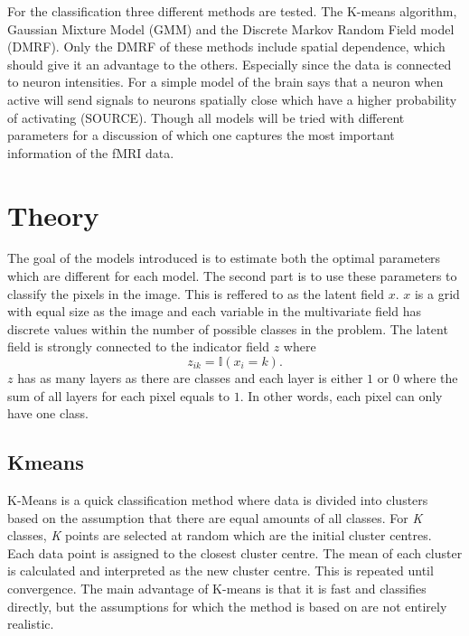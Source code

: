 \documentclass[a4paper,english]{article}
\begin{document}
For the classification three different methods are tested.
The K-means algorithm, Gaussian Mixture Model (GMM) and the Discrete Markov Random Field model (DMRF).
Only the DMRF of these methods include spatial dependence, which should give it an advantage to the others.
Especially since the data is connected to neuron intensities.
For a simple model of the brain says that a neuron when active will send signals to neurons spatially close which have a higher probability of activating (SOURCE).
Though all models will be tried with different parameters for a discussion of which one captures the most important information of the fMRI data.

\section{Theory}
The goal of the models introduced is to estimate both the optimal parameters which are different for each model.
The second part is to use these parameters to classify the pixels in the image.
This is reffered to as the latent field $x$.
$x$ is a grid with equal size as the image and each variable in the multivariate field has discrete values within the number of possible classes in the problem.
The latent field is strongly connected to the indicator field $z$ where
\begin{equation}
  z_{ik} = \mathds{I}(x_i = k).
\end{equation}
$z$ has as many layers as there are classes and each layer is either $1$ or $0$ where the sum of all layers for each pixel equals to $1$.
In other words, each pixel can only have one class.

\subsection{Kmeans}

K-Means is a quick classification method where data is divided into clusters based on the assumption that there are equal amounts of all classes. For \textit{K} classes, \textit{K} points are selected at random which are the initial cluster centres. Each data point is assigned to the closest cluster centre. The mean of each cluster is calculated and interpreted as the new cluster centre. This is repeated until convergence. The main advantage of K-means is that it is fast and classifies directly, but the assumptions for which the method is based on are not entirely realistic.
\end{document}
